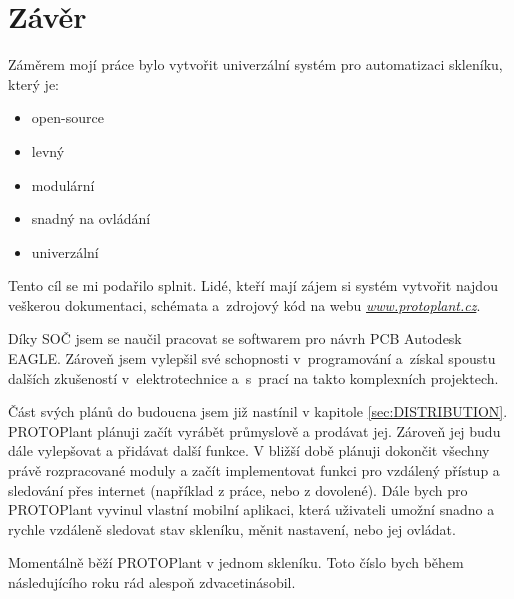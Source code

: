 \chapter*{Závěr}

Záměrem mojí práce bylo vytvořit univerzální systém pro automatizaci skle\-ní\-ku, který je:
\begin{itemize}
    \item open-source
    \item levný
    \item modulární
    \item snadný na ovládání
    \item univerzální
\end{itemize}

Tento cíl se mi podařilo splnit.
Lidé, kteří mají zájem si systém vytvořit najdou veškerou dokumentaci, schémata a~zdrojový kód na webu \textit{\url{www.protoplant.cz}}.

Díky SOČ jsem se naučil pracovat se softwarem pro návrh PCB Autodesk EAGLE.
Zároveň jsem vylepšil své schopnosti v~programování a~získal spoustu dalších zkušeností v~elektrotechnice a~s~prací na takto komplexních projektech.

Část svých plánů do budoucna jsem již nastínil v kapitole \ref{sec:DISTRIBUTION}.
PROTOPlant plánuji začít vyrábět průmyslově a prodávat jej.
Zároveň jej budu dále vylepšovat a přidávat další funkce.
V bližší době plánuji dokončit všechny právě rozpracované moduly a začít implementovat funkci pro vzdálený přístup a sledování přes internet (například z práce, nebo z dovolené).
Dále bych pro PROTOPlant vyvinul vlastní mobilní aplikaci, která uživateli umožní snadno a rychle vzdáleně sledovat stav skleníku, měnit nastavení, nebo jej ovládat.

Momentálně běží PROTOPlant v jednom skleníku. 
Toto číslo bych během následujícího roku rád alespoň zdvacetinásobil. 

\newpage